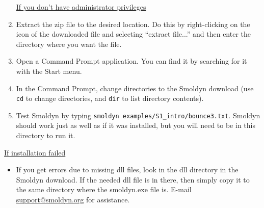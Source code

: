 \documentclass {book}
\newcommand {\ttt} {\texttt}
\newcommand\setItemnumber[1]{\setcounter{enumi}{\numexpr#1-1\relax}}
\begin{document}
\begin{enumerate}
\underline{If you don't have administrator privileges}
\setItemnumber{2}
\item Extract the zip file to the desired location. Do this by right-clicking on the icon of the downloaded file and selecting ``extract file...'' and then enter the directory where you want the file.
\item Open a Command Prompt application. You can find it by searching for it with the Start menu.
\item In the Command Prompt, change directories to the Smoldyn download (use \ttt{cd} to change directories, and \ttt{dir} to list directory contents).
\item Test Smoldyn by typing \ttt{smoldyn examples/S1\_intro/bounce3.txt}. Smoldyn should work just as well as if it was installed, but you will need to be in this directory to run it.
\end{enumerate}

\underline{If installation failed}

\begin{itemize}

\item If you get errors due to missing dll files, look in the dll directory in the Smoldyn download. If the needed dll file is in there, then simply copy it to the same directory where the smoldyn.exe file is. E-mail \href{support@smoldyn.org}{support@smoldyn.org} for assistance.

\end{itemize}
\end{document}
